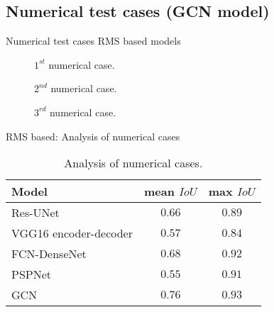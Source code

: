 \documentclass[10pt,aspectratio=169,dvipsnames]{beamer} %
\begin{document}
\subsection{Numerical test cases (GCN model)}
\setcounter{subfigure}{0}
\begin{frame}{Numerical test cases RMS based models}
	\begin{minipage}[c]{0.32\textwidth}
		\begin{figure}[c]
			\centering
			\caption{\(1^{st}\) numerical case.}
		\end{figure}
	\end{minipage}
	\hfill
	\begin{minipage}[c]{0.32\textwidth}
		\begin{figure}[c]
			\centering
			\caption{\(2^{nd}\) numerical case.}
		\end{figure}
	\end{minipage}
	\hfill
	\begin{minipage}[c]{0.32\textwidth}
		\begin{figure}[c]
			\centering
			\caption{\(3^{rd}\) numerical case.}
		\end{figure}
	\end{minipage}
\end{frame}

\begin{frame}{RMS based: Analysis of numerical cases}
	\begin{table}[ht!]
		\centering
		\caption{Analysis of numerical cases.}
		\label{tab:table_all_numerical_cases}	
		\begin{tabular}{lcc}
			\toprule
			Model & mean \(IoU\) & max \(IoU\) \\ 
			\midrule 
			Res-UNet & \(0.66\) & \(0.89\) \\ 
			VGG16 encoder-decoder & \(0.57\) & \(0.84\) \\ 
			FCN-DenseNet & \(0.68\) & \(0.92\) \\ 
			PSPNet & \(0.55\) & \(0.91\) \\ 
			GCN & \(0.76\) & \(0.93\) \\ 
			\bottomrule
		\end{tabular}
	\end{table}
\end{frame}
\end{document}
